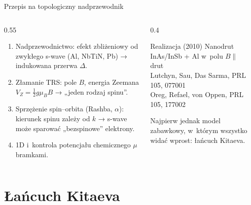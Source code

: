 \documentclass[aspectratio=169,10pt]{beamer}
\begin{document}
\begin{frame}{Przepis na topologiczny nadprzewodnik}
  \begin{columns}[T]
    \begin{column}{0.55\textwidth}
      \begin{enumerate}
        \item \alert{Nadprzewodnictwo}: efekt zbliżeniowy od zwykłego s-wave (Al, NbTiN, Pb)
              → indukowana przerwa $\Delta$.
        \item \alert{Złamanie TRS}: pole $B$, energia Zeemana
              $V_Z = \tfrac12 g\mu_B B$ → „jeden rodzaj spinu”.
        \item \alert{Sprzężenie spin–orbita} (Rashba, $\alpha$): kierunek spinu zależy
              od $k$ → s-wave może sparować „bezspinowe” elektrony.
        \item \alert{1D} i~kontrola potencjału chemicznego $\mu$ bramkami.
      \end{enumerate}
    \end{column}
    \begin{column}{0.4\textwidth}
      \begin{block}{Realizacja (2010)}
        Nanodrut InAs/InSb + Al w~polu $B\parallel$ drut\\[1mm]
        {\footnotesize Lutchyn, Sau, Das Sarma, PRL 105, 077001\\
        Oreg, Refael, von Oppen, PRL 105, 177002}
      \end{block}
      \vspace{2mm}
      Najpierw jednak model zabawkowy, w~którym wszystko widać wprost:
      \alert{łańcuch Kitaeva}.
    \end{column}
  \end{columns}
\end{frame}

\section{Łańcuch Kitaeva}
\end{document}
